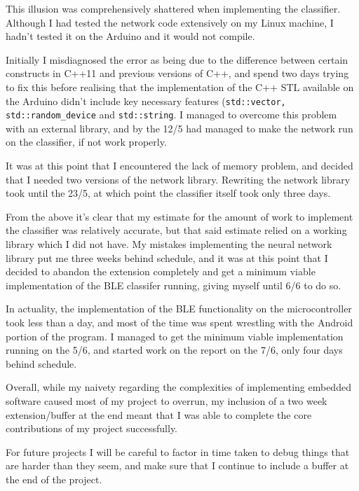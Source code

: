 \documentclass[a4paper]{article}
\begin{document}
This illusion was comprehensively shattered when implementing the classifier. Although I had tested the network code extensively on my Linux machine, I hadn't tested it on the Arduino and it would not compile.

Initially I misdiagnosed the error as being due to the difference between certain constructs in C++11 and previous versions of C++, and spend two days trying to fix this before realising that the implementation of the C++ STL available on the Arduino didn't include key necessary features (\lstinline{std::vector, std::random_device} and \lstinline{std::string}. I managed to overcome this problem with an external library, and by the 12/5 had managed to make the network run on the classifier, if not work properly.

It was at this point that I encountered the lack of memory problem, and decided that I needed two versions of the network library. Rewriting the network library took until the 23/5, at which point the classifier itself took only three days. 

From the above it's clear that my estimate for the amount of work to implement the classifier was relatively accurate, but that said estimate relied on a working library which I did not have. My mistakes implementing the neural network library put me three weeks behind schedule, and it was at this point that I decided to abandon the extension completely and get a minimum viable implementation of the BLE classifer running, giving myself until 6/6 to do so.

In actuality, the implementation of the BLE functionality on the microcontroller took less than a day, and most of the time was spent wrestling with the Android portion of the program. I managed to get the minimum viable implementation running on the 5/6, and started work on the report on the 7/6, only four days behind schedule.


Overall, while my naivety regarding the complexities of implementing embedded software caused most of my project to overrun, my inclusion of a two week extension/buffer at the end meant that I was able to complete the core contributions of my project successfully. 

For future projects I will be careful to factor in time taken to debug things that are harder than they seem, and make sure that I continue to include a buffer at the end of the project.
\end{document}
